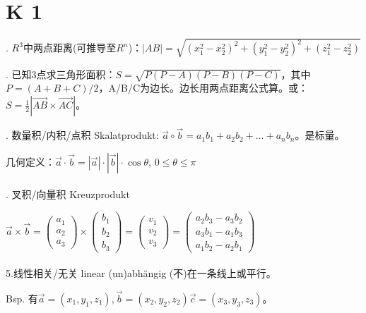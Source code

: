 \documentclass[fleqn]{article}
\begin{document}

\pagestyle{main}

\section{K 1}

. $R^3$中两点距离(可推导至$R^n$)：$|AB|=\sqrt{(x_1^2-x_2^2)^2+(y_1^2-y_2^2)^2+(z_1^2-z_2^2)}$

. 已知3点求三角形面积：$S=\sqrt{P(P-A)(P-B)(P-C)}$，其中$P=(A+B+C)/2$，A/B/C为边长。边长用两点距离公式算。或：$S=\frac{1}{2}|\overrightarrow{AB}\times\overrightarrow{AC}|$。

. 数量积/内积/点积 Skalatprodukt: $\vec{a}\circ\vec{b}=a_1b_1+a_2b_2+\dots+a_nb_n$。是标量。

几何定义：$\vec{a}\cdot\vec{b}=|\vec{a}|\cdot|\vec{b}|\cdot \cos\theta,\,0\leq \theta\leq \pi$
\\
\\
. 叉积/向量积 Kreuzprodukt

$\vec{a}\times\vec{b}=\begin{pmatrix}
    a_1 \\ a_2\\a_3
\end{pmatrix}\times\begin{pmatrix}
    b_1 \\ b_2\\b_3
\end{pmatrix}=\begin{pmatrix}
    v_1 \\ v_2\\v_3
\end{pmatrix}=\begin{pmatrix}
    a_2b_3-a_3b_2 \\ a_3b_1-a_1b_3\\a_1b_2-a_2b_1
\end{pmatrix}$
\\
\\
\noindent 5.线性相关/无关 linear (un)abhängig (不)在一条线上或平行。

Bsp. 有$\vec{a}=(x_1,y_1,z_1),\vec{b}=(x_2,y_2,z_2)\vec{c}=(x_3,y_3,z_3)$。
\end{document}
